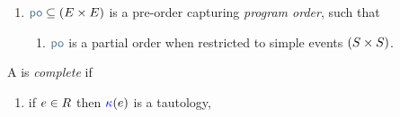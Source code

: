 \begin{definition}
\begin{enumerate}[,label=(\textsc{m}\arabic*),ref=\textsc{m}\arabic*]
\begin{multicols}{2}
\begin{enumerate}
    \item \label{pom-m-kappa} 
      if $\aEv\in\dmEvs$ then 
    \end{enumerate}
    \end{multicols}

  \item \label{pom-po} 
    ${\rpox} \subseteq (\aEvs\times\aEvs)$ is a pre-order capturing
    \emph{program order}, such that
    \begin{enumerate}
    \item \label{pom-po-le}
      $\rpox$ is a partial order when restricted to simple events $(S\times S)$.
    \end{enumerate}
  \end{enumerate}


  A \PwTpo{} is \emph{complete} if 
  \begin{multicols}{2}
    \begin{enumerate}[,label=(\textsc{c}\arabic*),ref=\textsc{c}\arabic*]

      \setcounter{enumi}{\value{Bkappa}}
    \item \label{top-kappa-c11}
      if $e\in R$ then ${\color{blue}\kappa}(e)$ is a tautology,



\end{enumerate}
\end{multicols}
\end{definition}
